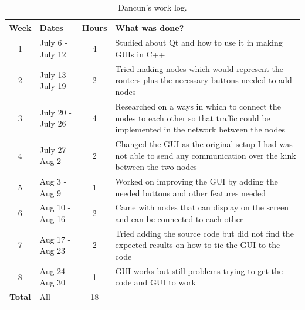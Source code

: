 \begin{table}[!htbp]
\footnotesize{
\begin{tabular}{c|p{}|c|p{}}
\textbf{Week} & \textbf{Dates} & \textbf{Hours} & \textbf{What was done?} \\
\hline 1 & July 6 - July 12     & 4 & Studied about Qt and how to use it in making GUIs in C++ \\
\hline 2 & July 13 - July 19    & 2 & Tried making nodes which would represent the routers plus the necessary buttons needed to add nodes \\
\hline 3 & July 20 - July 26    & 4 & Researched on a ways in which to connect the nodes to each other so that traffic could be implemented in the network between the nodes \\
\hline 4 & July 27 - Aug 2      & 2 & Changed the GUI as the original setup I had was not able to send any communication over the kink between the two nodes \\
\hline 5 & Aug 3 - Aug 9        & 1 & Worked on improving the GUI by adding the needed buttons and other features needed \\
\hline 6 & Aug 10 - Aug 16      & 2 & Came with nodes that can display on the screen and can be connected to each other \\
\hline 7 & Aug 17 - Aug 23      & 2 & Tried adding the source code but did not find the expected results on how to tie the GUI to the code \\
\hline 8 & Aug 24 - Aug 30      & 1 & GUI works but still problems trying to get the code and GUI to work \\
\hline\hline\textbf{Total}&All  & 18 & - \\
\end{tabular}
}
\caption{Dancun's work log. }
\label{table:worklog-dancun}
\end{table}


